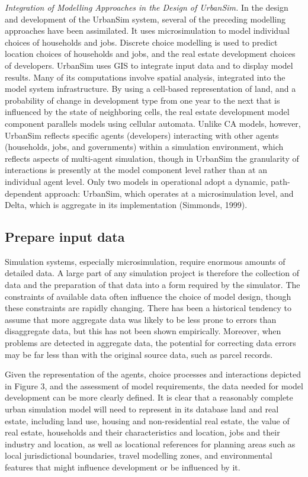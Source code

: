 \emph{Integration of Modelling Approaches in the Design of UrbanSim.}  In the design and development of the UrbanSim system, several of the preceding modelling approaches have been assimilated.  It uses microsimulation to model individual choices of households and jobs.  Discrete choice modelling is used to predict location choices of households and jobs, and the real estate development choices of developers.  UrbanSim uses GIS to integrate input data and to display model results.  Many of its computations involve spatial analysis, integrated into the model system infrastructure. By using a cell-based representation of land, and a probability of change in development type from one year to the next that is influenced by the state of neighboring cells, the real estate development model component parallels models using cellular automata.  Unlike CA models, however, UrbanSim reflects specific agents (developers) interacting with other agents (households, jobs, and governments) within a simulation environment, which reflects aspects of multi-agent simulation, though in UrbanSim the granularity of interactions is presently at the model component level rather than at an individual agent level.  Only two models in operational adopt a dynamic, path-dependent approach: UrbanSim, which operates at a microsimulation level, and Delta, which is aggregate in its implementation (Simmonds, 1999).

\subsection{Prepare input data}

Simulation systems, especially microsimulation, require enormous amounts of detailed data. A large part of any simulation project is therefore the collection of data and the preparation of that data into a form required by the simulator.  The constraints of available data often influence the choice of model design, though these constraints are rapidly changing.  There has been a historical tendency to assume that more aggregate data was likely to be less prone to errors than disaggregate data, but this has not been shown empirically.  Moreover, when problems are detected in aggregate data, the potential for correcting data errors may be far less than with the original source data, such as parcel records.

Given the representation of the agents, choice processes and interactions depicted in Figure 3, and the assessment of model requirements, the data needed for model development can be more clearly defined.  It is clear that a reasonably complete urban simulation model will need to represent in its database land and real estate, including land use, housing and non-residential real estate, the value of real estate, households and their characteristics and location, jobs and their industry and location, as well as locational references for planning areas such as local jurisdictional boundaries, travel modelling zones, and environmental features that might influence development or be influenced by it.

